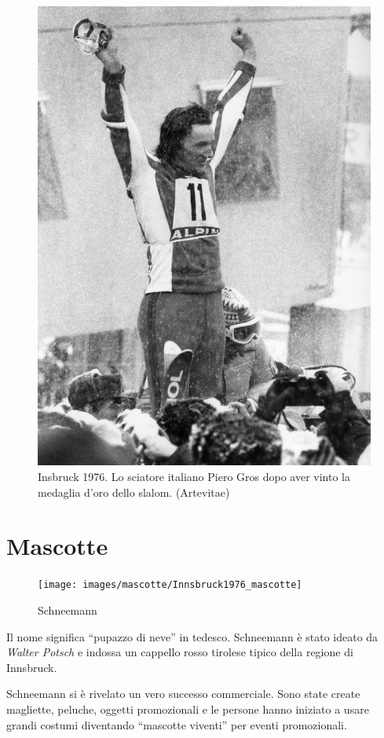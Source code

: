 \documentclass[
]{book}
\begin{document}
\begin{figure}
\includegraphics[width=0.8\linewidth]{images/ArteVitae/1976} \caption{Insbruck 1976. Lo sciatore italiano Piero Gros dopo aver vinto la medaglia d’oro dello slalom. (Artevitae)}\label{fig:unnamed-chunk-39}
\end{figure}

\section*{Mascotte}\label{mascotte-1}

\begin{figure}
\texttt{[image: images/mascotte/Innsbruck1976\_mascotte]} \caption{Schneemann}\label{fig:unnamed-chunk-40}
\end{figure}

Il nome significa ``pupazzo di neve'' in tedesco. Schneemann è stato ideato da \emph{Walter Potsch} e indossa un cappello rosso tirolese tipico della regione di Innsbruck.

Schneemann si è rivelato un vero successo commerciale. Sono state create magliette, peluche, oggetti promozionali e le persone hanno iniziato a usare grandi costumi diventando ``mascotte viventi'' per eventi promozionali.
\end{document}
